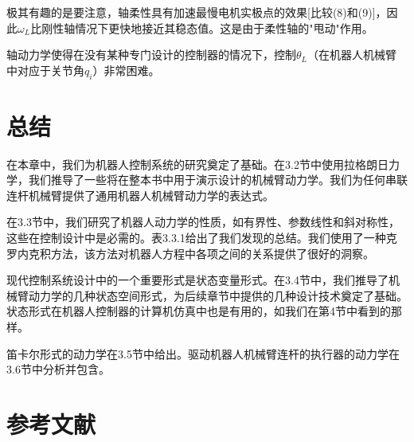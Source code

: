 \documentclass[12pt,a4paper]{ctexart}
\begin{document}
极其有趣的是要注意，轴柔性具有加速最慢电机实极点的效果[比较(8)和(9)]，因此$\omega_L$比刚性轴情况下更快地接近其稳态值。这是由于柔性轴的"甩动"作用。

轴动力学使得在没有某种专门设计的控制器的情况下，控制$\theta_L$（在机器人机械臂中对应于关节角$q_i$）非常困难。

\section{总结}

在本章中，我们为机器人控制系统的研究奠定了基础。在3.2节中使用拉格朗日力学，我们推导了一些将在整本书中用于演示设计的机械臂动力学。我们为任何串联连杆机械臂提供了通用机器人机械臂动力学的表达式。

在3.3节中，我们研究了机器人动力学的性质，如有界性、参数线性和斜对称性，这些在控制设计中是必需的。表3.3.1给出了我们发现的总结。我们使用了一种克罗内克积方法，该方法对机器人方程中各项之间的关系提供了很好的洞察。

现代控制系统设计中的一个重要形式是状态变量形式。在3.4节中，我们推导了机械臂动力学的几种状态空间形式，为后续章节中提供的几种设计技术奠定了基础。状态形式在机器人控制器的计算机仿真中也是有用的，如我们在第4节中看到的那样。

笛卡尔形式的动力学在3.5节中给出。驱动机器人机械臂连杆的执行器的动力学在3.6节中分析并包含。

\section{参考文献}
\end{document}
